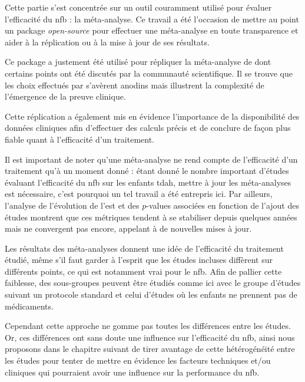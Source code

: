 Cette partie s'est concentrée sur un outil couramment utilisé pour évaluer l'efficacité du \gls{nfb} : la méta-analyse. Ce travail a été l'occasion de mettre au point un package 
\textsl{open-source} pour effectuer une méta-analyse en toute transparence et aider à la réplication ou à la mise à jour de ses résultats.

Ce package a justement été utilisé pour répliquer la méta-analyse de \citet{Cortese2016} dont certains points ont été discutés par la communauté scientifique. 
Il se trouve que les choix effectués par \citet{Cortese2016} s'avèrent anodins mais illustrent la complexité de l'émergence de la preuve
clinique.

Cette réplication a également mis en évidence l'importance de la disponibilité des données cliniques afin d'effectuer des calculs précis et de conclure de façon
plus fiable quant à l'efficacité d'un traitement. 

Il est important de noter qu'une méta-analyse ne rend compte de l'efficacité d'un traitement qu'à un moment donné : étant donné le nombre important d'études évaluant l'efficacité du \gls{nfb} 
sur les enfants \gls{tdah}, mettre à jour les méta-analyses est nécessaire, c'est pourquoi un tel travail a été entrepris ici. Par ailleurs, l'analyse de l'évolution de l'\gls{est} et des $p$-values 
associées en fonction de l'ajout des études montrent que ces métriques tendent à se stabiliser depuis quelques années mais ne convergent pas encore, appelant à de nouvelles mises à jour.  

Les résultats des méta-analyses donnent une idée de l'efficacité du traitement étudié, même s'il faut garder à l'esprit que les études incluses
diffèrent sur différents points, ce qui est notamment vrai pour le \gls{nfb}. Afin de pallier cette faiblesse, des sous-groupes peuvent être étudiés comme ici avec le groupe d'études
suivant un protocole standard et celui d'études où les enfants ne prennent pas de médicaments.

Cependant cette approche ne gomme pas toutes les différences entre les études. Or, ces différences ont sans doute une influence sur l'efficacité du \gls{nfb}, ainsi nous proposons dans le chapitre 
suivant de tirer avantage de cette hétérogénéité entre les études pour tenter de mettre en évidence les facteurs 
techniques et/ou cliniques qui pourraient avoir une influence sur la performance du \gls{nfb}.

  